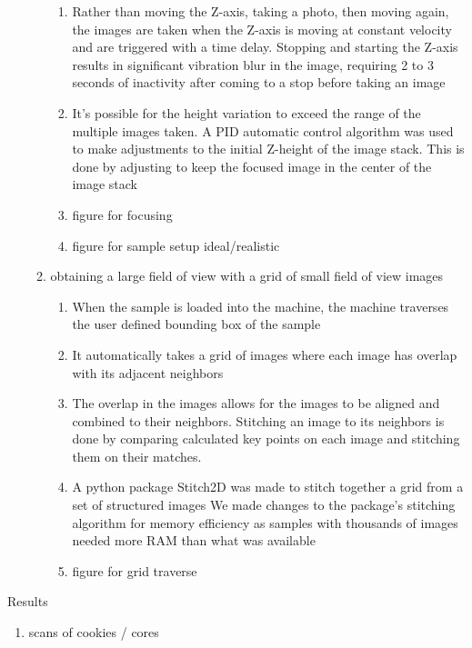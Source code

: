 \documentclass{article}
\begin{document}
\begin{outline}[enumerate]
\begin{enumerate}
\begin{enumerate}
\begin{enumerate}
				\item Rather than moving the Z-axis, taking a photo, then moving again, the images are taken when the Z-axis is moving at constant velocity and are triggered with a time delay. Stopping and starting the Z-axis results in significant vibration blur in the image, requiring 2 to 3 seconds of inactivity after coming to a stop before taking an image
				\item It's possible for the height variation to exceed the range of the multiple images taken. A PID automatic control algorithm was used to make adjustments to the initial Z-height of the image stack. This is done by adjusting to keep the focused image in the center of the image stack %
				\item figure for focusing 
				\item figure for sample setup ideal/realistic
				\end{enumerate}
			\item obtaining a large field of view with a grid of small field of view images 
				\begin{enumerate}
				\item When the sample is loaded into the machine, the machine traverses the user defined bounding box of the sample
				\item It automatically takes a grid of images where each image has overlap with its adjacent neighbors
				\item The overlap in the images allows for the images to be aligned and combined to their neighbors. Stitching an image to its neighbors is done by comparing calculated key points on each image and stitching them on their matches.
				\item A python package Stitch2D was made to stitch together a grid from a set of structured images %
					\subitem We made changes to the package's stitching algorithm for memory efficiency as samples with thousands of images needed more RAM than what was available
				\item figure for grid traverse
				\end{enumerate}
			\end{enumerate}
		\end{enumerate}
\item Results
	\begin{enumerate}
	\item scans of cookies / cores
		\begin{enumerate}

\end{enumerate}
\end{enumerate}
\end{outline}
\end{document}
